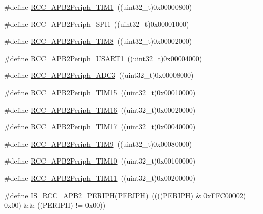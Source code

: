 \begin{DoxyCompactItemize}
\item 
\#define \mbox{\hyperlink{group___a_p_b2__peripheral_ga0d9babf212897db0b3aa852f8a71160b}{R\+C\+C\+\_\+\+A\+P\+B2\+Periph\+\_\+\+T\+I\+M1}}~((uint32\+\_\+t)0x00000800)
\item 
\#define \mbox{\hyperlink{group___a_p_b2__peripheral_ga289cc086580f4b6a080ea0ed3dd4a7af}{R\+C\+C\+\_\+\+A\+P\+B2\+Periph\+\_\+\+S\+P\+I1}}~((uint32\+\_\+t)0x00001000)
\item 
\#define \mbox{\hyperlink{group___a_p_b2__peripheral_gac951d41a08140a7d38a4faff8dd1e03e}{R\+C\+C\+\_\+\+A\+P\+B2\+Periph\+\_\+\+T\+I\+M8}}~((uint32\+\_\+t)0x00002000)
\item 
\#define \mbox{\hyperlink{group___a_p_b2__peripheral_ga14e1b3b6d84801c223a37a954b5b1910}{R\+C\+C\+\_\+\+A\+P\+B2\+Periph\+\_\+\+U\+S\+A\+R\+T1}}~((uint32\+\_\+t)0x00004000)
\item 
\#define \mbox{\hyperlink{group___a_p_b2__peripheral_ga371d55bbf17bf965a213c59f2d276d72}{R\+C\+C\+\_\+\+A\+P\+B2\+Periph\+\_\+\+A\+D\+C3}}~((uint32\+\_\+t)0x00008000)
\item 
\#define \mbox{\hyperlink{group___a_p_b2__peripheral_ga774f9082c3331890c06b9fd9deafe549}{R\+C\+C\+\_\+\+A\+P\+B2\+Periph\+\_\+\+T\+I\+M15}}~((uint32\+\_\+t)0x00010000)
\item 
\#define \mbox{\hyperlink{group___a_p_b2__peripheral_ga739d0a5fe583f07f5b6fa320f2d2e53a}{R\+C\+C\+\_\+\+A\+P\+B2\+Periph\+\_\+\+T\+I\+M16}}~((uint32\+\_\+t)0x00020000)
\item 
\#define \mbox{\hyperlink{group___a_p_b2__peripheral_ga5a6217b6200d6679dc7bee4522d6038a}{R\+C\+C\+\_\+\+A\+P\+B2\+Periph\+\_\+\+T\+I\+M17}}~((uint32\+\_\+t)0x00040000)
\item 
\#define \mbox{\hyperlink{group___a_p_b2__peripheral_ga24d0145dc172bc27ed580770cf15e4d9}{R\+C\+C\+\_\+\+A\+P\+B2\+Periph\+\_\+\+T\+I\+M9}}~((uint32\+\_\+t)0x00080000)
\item 
\#define \mbox{\hyperlink{group___a_p_b2__peripheral_ga75069120ecbe86920b39c2b75c909438}{R\+C\+C\+\_\+\+A\+P\+B2\+Periph\+\_\+\+T\+I\+M10}}~((uint32\+\_\+t)0x00100000)
\item 
\#define \mbox{\hyperlink{group___a_p_b2__peripheral_gaba591104f4e31b1e8ce98c269035850f}{R\+C\+C\+\_\+\+A\+P\+B2\+Periph\+\_\+\+T\+I\+M11}}~((uint32\+\_\+t)0x00200000)
\item 
\#define \mbox{\hyperlink{group___a_p_b2__peripheral_ga89a2b95e60e90a51b26b53cc4c0e7b14}{I\+S\+\_\+\+R\+C\+C\+\_\+\+A\+P\+B2\+\_\+\+P\+E\+R\+I\+PH}}(P\+E\+R\+I\+PH)~((((P\+E\+R\+I\+PH) \& 0x\+F\+F\+C00002) == 0x00) \&\& ((\+P\+E\+R\+I\+P\+H) != 0x00))
\end{DoxyCompactItemize}


